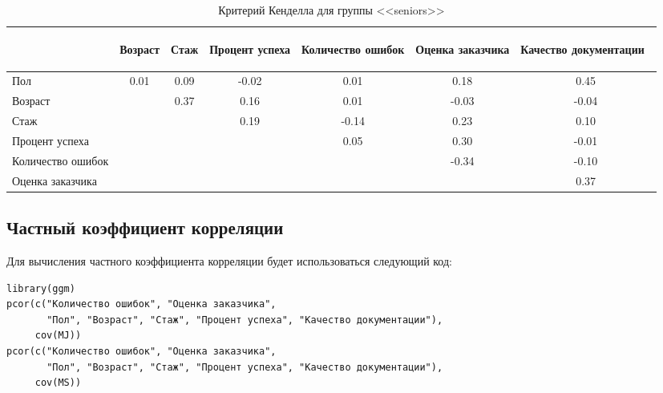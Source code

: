 \begin{table}[H]
	\centering
	\caption{Критерий Кенделла для группы <<seniors>>}
	\begin{tabular}{|l|c|c|c|c|c|c|}
		\hline
		&
		\begin{sideways}
			Возраст
		\end{sideways}  & 
		\begin{sideways}
			Стаж
		\end{sideways} & 
		\begin{sideways}
			Процент успеха
		\end{sideways} & 
		\begin{sideways}
			Количество ошибок
		\end{sideways} &
		\begin{sideways}
			Оценка заказчика
		\end{sideways} & 
		\begin{sideways}
			Качество документации~
		\end{sideways} \\ \hline
		Пол                   & 0.01 & 0.09 & -0.02 & 0.01 & 0.18 & 0.45  \\ \hline
		Возраст               && 0.37 & 0.16  & 0.01 & -0.03 & -0.04  \\ \hline
		Стаж                  &&&  0.19 & -0.14  &0.23  &  0.10 \\ \hline
		Процент успеха        &&&& 0.05 & 0.30 &  -0.01 \\ \hline
		Количество ошибок     &&&&& -0.34 & -0.10 \\ \hline
		Оценка заказчика      &&&&&& 0.37  \\ \hline 	
	\end{tabular}
	\label{sen/k}
\end{table}


\subsection{Частный коэффициент корреляции}
Для вычисления частного коэффициента корреляции будет использоваться следующий код:

\begin{verbatim}
library(ggm)
pcor(c("Количество ошибок", "Оценка заказчика", 
       "Пол", "Возраст", "Стаж", "Процент успеха", "Качество документации"),
     cov(MJ))
pcor(c("Количество ошибок", "Оценка заказчика", 
       "Пол", "Возраст", "Стаж", "Процент успеха", "Качество документации"), 
     cov(MS))
\end{verbatim}

